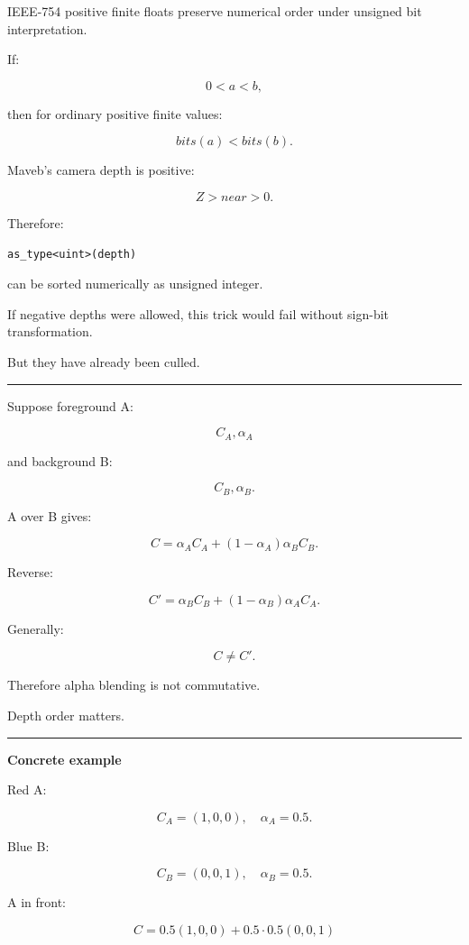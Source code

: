IEEE-754 positive finite floats preserve numerical order under unsigned bit interpretation.

If:

\[
0<a<b,
\]

then for ordinary positive finite values:

\[
bits(a)<bits(b).
\]

Maveb's camera depth is positive:

\[
Z>near>0.
\]

Therefore:

\begin{verbatim}
as_type<uint>(depth)
\end{verbatim}

can be sorted numerically as unsigned integer.

If negative depths were allowed, this trick would fail without sign-bit transformation.

But they have already been culled.

\begin{center}\rule{0.5\linewidth}{0.5pt}\end{center}

Suppose foreground A:

\[
C_A,\alpha_A
\]

and background B:

\[
C_B,\alpha_B.
\]

A over B gives:

\[
C=
\alpha_A C_A
+
(1-\alpha_A)
\alpha_B C_B.
\]

Reverse:

\[
C'=
\alpha_B C_B
+
(1-\alpha_B)
\alpha_A C_A.
\]

Generally:

\[
\boxed{
C\ne C'.
}
\]

Therefore alpha blending is not commutative.

Depth order matters.

\begin{center}\rule{0.5\linewidth}{0.5pt}\end{center}

\textbf{Concrete example}

Red A:

\[
C_A=(1,0,0),
\quad
\alpha_A=0.5.
\]

Blue B:

\[
C_B=(0,0,1),
\quad
\alpha_B=0.5.
\]

A in front:

\[
C=
0.5(1,0,0)
+
0.5\cdot0.5(0,0,1)
\]

